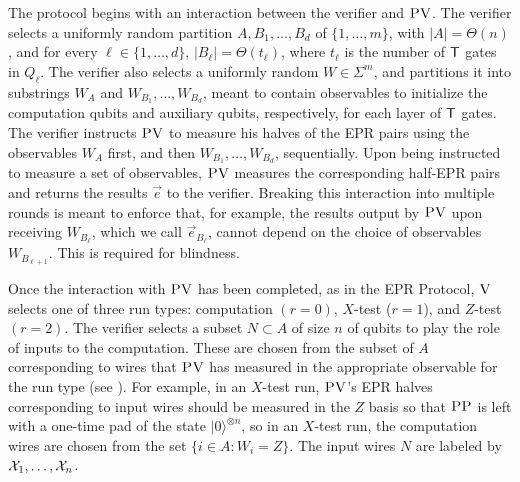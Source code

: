 \documentclass{toc}
\newcommand{\ket}[1]{|#1\rangle}
\newcommand{\ver}{\textsc{V}}
\newcommand{\pv}{\textsc{PV}}
\newcommand{\pp}{\textsc{PP}}
\begin{document}
The protocol begins with an interaction between the verifier and $\pv$. The verifier selects a uniformly random partition $A,B_1,\dots,B_d$ of $\{1,\dots,m\}$, with $|A|=\Theta(n)$, and for every $\ell\in\{1,\dots,d\}$, $|B_{\ell}|=\Theta(t_\ell)$, where $t_{\ell}$ is the number of $\sf T$ gates in $Q_\ell$. The verifier also selects a uniformly random $W\in\Sigma^m$, and partitions it into substrings $W_A$ and $W_{B_1},\ldots,W_{B_d}$, meant to contain observables to initialize the computation qubits and auxiliary qubits,
respectively, %
 for each layer of ${\sf T}$ gates.
%
The verifier instructs $\pv$ to measure his halves of the EPR pairs using the observables $W_A$ first, and then $W_{B_1},\ldots,W_{B_d}$, sequentially. Upon being instructed to measure a set of observables, $\pv$ measures the corresponding half-EPR pairs and returns the results $\vec{e}$ to the verifier. Breaking this interaction into multiple rounds is meant to enforce that, for example, the results output by $\pv$ upon receiving $W_{B_{\ell}}$, which we call $\vec{e}_{B_{\ell}}$, cannot depend on the choice of observables $W_{B_{\ell+1}}$. This is required for blindness. 

Once the interaction with $\pv$ has been completed, as in the EPR Protocol, $\ver$ selects one of three run types: computation $(r=0)$, $X$-test ($r=1$), and $Z$-test $(r=2)$. 
The verifier selects a subset $N\subset A$ of size $n$ of qubits to play the role of inputs to the computation. These are chosen from the subset of $A$ corresponding to wires that $\pv$ has measured in the appropriate observable for the run type (see ). For example, in an $X$-test run, $\pv$'s EPR halves corresponding to input wires should be measured in the $Z$ basis so that $\pp$ is left with a one-time pad of the state $\ket{0}^{\otimes n}$, so in an $X$-test run, the computation wires are chosen from the set $\{i\in A:W_i=Z\}$. The input wires $N$ are labeled by ${\cal X}_1,\dots,{\cal X}_n$. 
\end{document}

